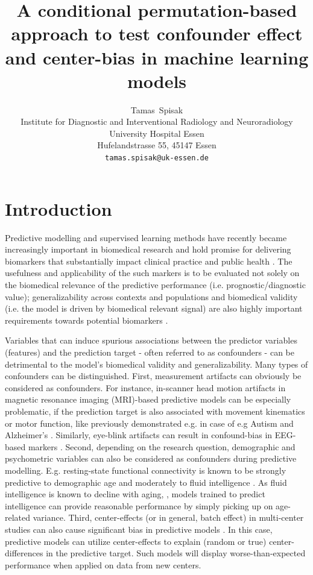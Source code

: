\documentclass{article}
\title{A conditional permutation-based approach to test confounder effect and center-bias in machine learning models}
\author{
  Tamas~Spisak \\
  Institute for Diagnostic and Interventional Radiology and Neuroradiology \\
  University Hospital Essen\\
  Hufelandstrasse 55, 45147 Essen \\
  \texttt{tamas.spisak@uk-essen.de} \\
}
\theoremstyle{definition}
\begin{document}
\maketitle

\begin{abstract} %
\lipsum[1]
\end{abstract}




\section{Introduction}

Predictive modelling and supervised learning methods have recently became increasingly important in biomedical research and hold promise for delivering biomarkers that substantially impact clinical practice and public health \citep{kent2018personalized}. The usefulness and applicability of the such markers is to be evaluated not solely on the biomedical relevance of the predictive performance (i.e. prognostic/diagnostic value); generalizability across contexts and populations and biomedical validity (i.e. the model is driven by biomedical relevant signal) are also highly important requirements towards potential biomarkers \citep{woo2017building}.

Variables that can induce spurious associations between the predictor variables (features) and the prediction target - often referred to as confounders - can be detrimental to the model's biomedical validity and generalizability. Many types of confounders can be distinguished.
First, measurement artifacts can obviously be considered as confounders. For instance, in-scanner head motion artifacts in magnetic resonance imaging (MRI)-based predictive models can be especially problematic, if the prediction target is also associated with movement kinematics or motor function, like previously demonstrated e.g. in case of e.g Autism \citep{spisak2014voxel, spisak2019optimal} and Alzheimer's \citep{rao2017predictive}. Similarly, eye-blink artifacts can result in confound-bias in EEG-based markers \citep{eldridge2014robust}.
Second, depending on the research question, demographic and psychometric variables can also be considered as confounders during predictive modelling. E.g. resting-state functional connectivity is known to be strongly predictive to  demographic age \citep{wang2012decoding, dukart2011age} and moderately to fluid intelligence \citep{he2020deep, cole2012global}. As fluid intelligence is known to decline with aging, \citep{kievit2018neural}, models trained to predict intelligence can provide reasonable performance by simply picking up on age-related variance. 
Third, center-effects (or in general, batch effect) in multi-center studies can also cause significant bias in predictive models \citep{leek2010tackling, da2020performance}. In this case, predictive models can utilize center-effects to explain (random or true) center-differences in the predictive target. Such models will display worse-than-expected performance when applied on data from new centers.
\end{document}
